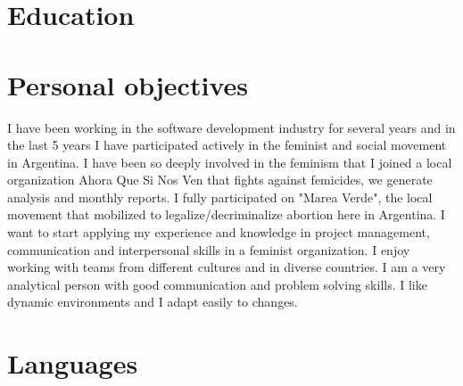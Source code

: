 \documentclass[11pt,a4paper,sans]{moderncv}
\begin{document}
\makecvtitle

\section{Education}



\section{Personal objectives}

I have been working in the software development industry for several years and in the last 5 years I have participated actively in the feminist and social movement in Argentina.
I have been so deeply involved in the feminism that I joined a local organization Ahora Que Si Nos Ven that fights against femicides, we generate analysis and monthly reports. I fully participated on "Marea Verde", the local movement that mobilized to legalize/decriminalize abortion here in Argentina.
I want to start applying my experience and knowledge in project management, communication and interpersonal skills in a feminist organization.
I enjoy working with teams from different cultures and in diverse countries. I am a very analytical person with good communication and problem solving skills.
I like dynamic environments and I adapt easily to changes.



\section{Languages}

\end{document}
